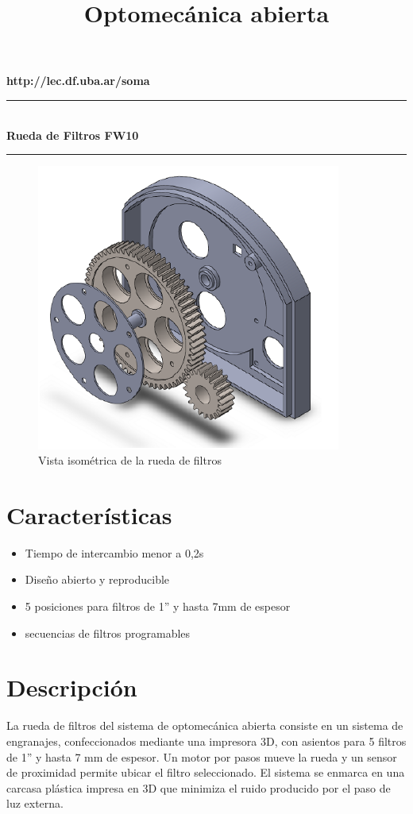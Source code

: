 \documentclass{article}
\title{Optomecánica abierta}
\begin{document}
\hfill \textbf{http://lec.df.uba.ar/soma}
\noindent
\rule{\linewidth}{0.5mm} \\[0.3cm]
{ \Large \bfseries Rueda de Filtros FW10 \\[0.3cm] }
\rule{\linewidth}{0.5mm}


\begin{figure}[H]
\centering
\includegraphics[width = 10cm]{ensamble1.png}
\caption{Vista isométrica de la rueda de filtros}
\label{fig:cny70:circuito}
\end{figure}

\section*{Características}
\begin{itemize}
\item Tiempo de intercambio menor a 0,2s
\item Diseño abierto y reproducible
\item 5 posiciones para filtros de 1” y hasta 7mm de espesor
\item secuencias de filtros programables

\end{itemize}

\section*{Descripción}
La rueda de filtros del sistema de optomecánica abierta consiste en un sistema de engranajes, confeccionados mediante una impresora 3D, con asientos para 5 filtros de 1” y hasta 7 mm de espesor. Un motor por pasos mueve la rueda y un sensor de proximidad permite ubicar el filtro seleccionado. El sistema se enmarca en una carcasa plástica impresa en 3D que minimiza el ruido producido por el paso de luz externa.\\
\end{document}
